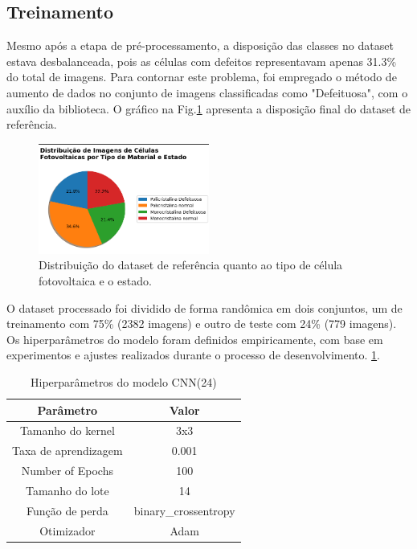\documentclass[conference]{IEEEtran}
\begin{document}
\subsection{Treinamento}\label{AA}

Mesmo após a etapa de pré-processamento, a disposição das classes no dataset
estava desbalanceada, pois as células com defeitos representavam apenas
31.3\% do total de imagens. Para contornar este problema, foi empregado
o método de aumento de dados no conjunto de imagens classificadas como
"Defeituosa", com o auxílio da biblioteca. O gráfico na
Fig.\ref{fig:dataset-overview} apresenta a disposição final do dataset de
referência.

\begin{figure}[htbp]

    \centerline{\includegraphics[width=0.5\textwidth]{images/dataset-overview.png}}
    \caption{Distribuição do dataset de referência quanto ao tipo de célula
        fotovoltaica e o estado.}
    \label{fig:dataset-overview}
\end{figure}

O dataset processado foi dividido de forma randômica em dois conjuntos, um de
treinamento
com 75\% (2382 imagens) e outro de teste com 24\% (779 imagens). Os
hiperparâmetros do modelo foram definidos empiricamente, com base em
experimentos e ajustes realizados durante o processo de desenvolvimento.
\ref{tab:hiperparametros}.

\begin{table}[h!]
    \caption{Hiperparâmetros do modelo CNN(24)}
    \centering
    \begin{tabular}{|c|c|}
        \hline
        \textbf{Parâmetro}   & \textbf{Valor}       \\ \hline
        Tamanho do kernel    & 3x3                  \\ \hline
        Taxa de aprendizagem & 0.001                \\ \hline
        Number of Epochs     & 100                  \\ \hline
        Tamanho do lote      & 14                   \\ \hline
        Função de perda      & binary\_crossentropy \\ \hline
        Otimizador           & Adam                 \\ \hline
    \end{tabular}
    \label{tab:hiperparametros}
\end{table}
\end{document}

